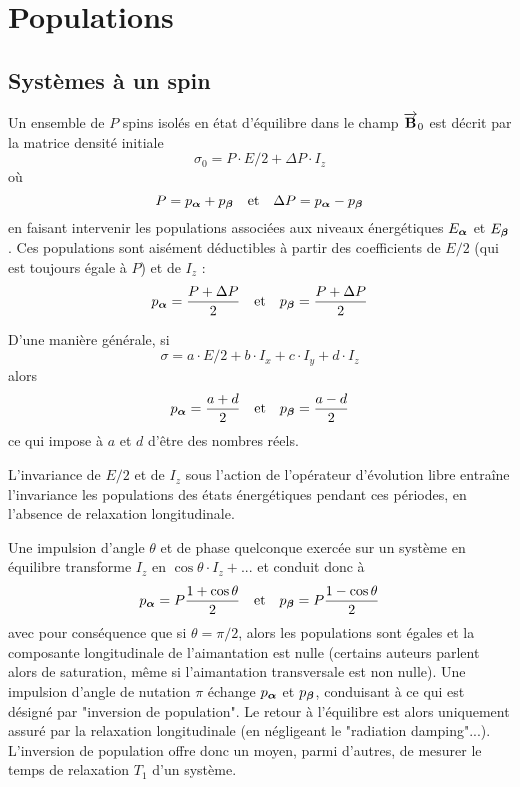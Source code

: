 \section{Populations} 
\label{sec:population}

\subsection{Systèmes à un spin}
\label{sec:popun}
Un ensemble de $P$ spins isolés en état d'équilibre dans le champ $\overrightarrow{\mathbf{B}}_0$
est décrit par la matrice densité initiale
\begin{equation}
\sigma_0 = P \cdot E/2 + \Delta P \cdot I_z
\end{equation}
où 
\begin{equation}
P = p_{\boldsymbol{\alpha}} + p_{\boldsymbol{\beta}} \quad \mbox{et} \quad \Delta P = p_{\boldsymbol{\alpha}} - p_{\boldsymbol{\beta}}
\end{equation}
en faisant intervenir
les populations associées aux niveaux énergétiques $E_{\boldsymbol{\alpha}}$ et $E_{\boldsymbol{\beta}}$.
Ces populations sont aisément déductibles à partir des coefficients
de $E/2$ (qui est toujours égale à $P$) et de $I_z$ :
\begin{equation}
p_{\boldsymbol{\alpha}} = \frac{P + \Delta P}{2} \quad \mbox{et} \quad p_{\boldsymbol{\beta}} = \frac{P + \Delta P}{2}
\end{equation}

D'une manière générale, si
\begin{equation}
\sigma = a \cdot E/2 + b \cdot I_x + c \cdot I_y + d \cdot I_z
\end{equation}
alors
\begin{equation}
p_{\boldsymbol{\alpha}} = \frac{a+d}{2} \quad \mbox{et} \quad p_{\boldsymbol{\beta}} = \frac{a-d}{2}
\end{equation}
ce qui impose à $a$ et $d$ d'être des nombres réels.

L'invariance de $E/2$ et de $I_z$ sous l'action de l'opérateur
d'évolution libre entraîne l'invariance les populations des
états énergétiques pendant ces périodes, en l'absence de relaxation
longitudinale.

Une impulsion d'angle $\theta$ et de phase quelconque
exercée sur un système en équilibre transforme $I_z$ en
$\cos\theta \cdot I_z + ...$ et conduit donc à
\begin{equation}
p_{\boldsymbol{\alpha}} = P\frac{1+\cos\theta}{2} \quad \mbox{et} \quad
p_{\boldsymbol{\beta}} = P\frac{1-\cos\theta}{2}
\end{equation}
avec pour conséquence que si $\theta = \pi / 2$, alors les populations
sont égales et la composante longitudinale de l'aimantation est nulle
(certains auteurs parlent alors de saturation, même si l'aimantation
transversale est non nulle).
Une impulsion d'angle de nutation $\pi$ échange $p_{\boldsymbol{\alpha}}$ et $p_{\boldsymbol{\beta}}$,
conduisant à ce qui est désigné par "inversion de population".
Le retour à l'équilibre est alors uniquement assuré par
la relaxation longitudinale (en négligeant le "radiation damping"...).
L'inversion de population offre donc un moyen, parmi d'autres, de mesurer
le temps de relaxation $T_1$ d'un système.

